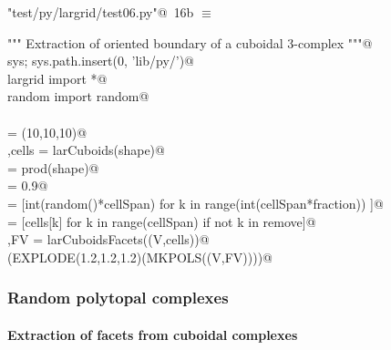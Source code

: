 \documentclass[11pt,oneside]{article}	%
\begin{document}
\begin{flushleft} \small \label{scrap24}
\protect{}\verb@"test/py/largrid/test06.py"@\nobreak\ {\footnotesize 16b }$\equiv$
\vspace{-1ex}
\begin{list}{}{} \item
\mbox{}\verb@""" Extraction of oriented boundary of a cuboidal 3-complex """@\\
\mbox{}\verb@import sys; sys.path.insert(0, 'lib/py/')@\\
\mbox{}\verb@from largrid import *@\\
\mbox{}\verb@from random import random@\\
\mbox{}\verb@@\\
\mbox{}\verb@shape = (10,10,10)@\\
\mbox{}\verb@V,cells = larCuboids(shape)@\\
\mbox{}\verb@cellSpan = prod(shape)@\\
\mbox{}\verb@fraction = 0.9@\\
\mbox{}\verb@remove = [int(random()*cellSpan) for k in range(int(cellSpan*fraction)) ]@\\
\mbox{}\verb@cells = [cells[k] for k in range(cellSpan) if not k in remove]@\\
\mbox{}\verb@V,FV = larCuboidsFacets((V,cells))@\\
\mbox{}\verb@VIEW(EXPLODE(1.2,1.2,1.2)(MKPOLS((V,FV))))@\\
\mbox{}\verb@@{\NWsep}
\end{list}
\vspace{-2ex}
\end{flushleft}



\subsubsection{Random polytopal complexes}


\paragraph{Extraction of facets from cuboidal complexes}
\end{document}
